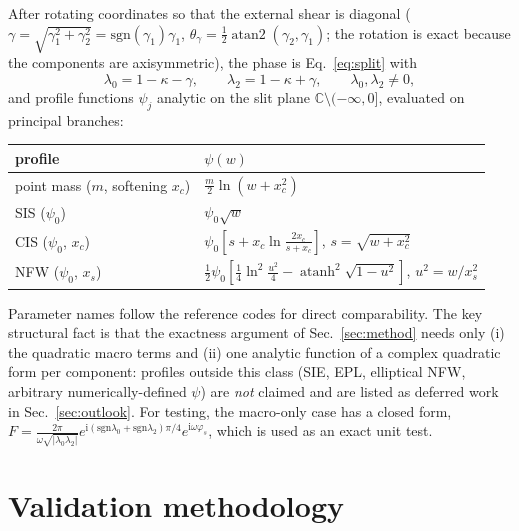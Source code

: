 \documentclass[11pt,a4paper]{article}
\newcommand{\Fresnel}{F}
\newcommand{\ii}{\mathrm{i}}
\newcommand{\C}{\mathbb{C}}
\begin{document}
After rotating coordinates so that the external shear is diagonal
($\gamma = \sqrt{\gamma_1^2+\gamma_2^2} = \mathrm{sgn}(\gamma_1)\gamma_1$,
$\theta_\gamma = \tfrac12\operatorname{atan2}(\gamma_2,\gamma_1)$; the
rotation is exact because the components are axisymmetric), the phase is
Eq.~\eqref{eq:split} with
\begin{equation}
  \lambda_0 = 1-\kappa-\gamma,\qquad \lambda_2 = 1-\kappa+\gamma,
  \qquad \lambda_0,\lambda_2 \neq 0 ,
  \label{eq:lambdas}
\end{equation}
and profile functions $\psi_j$ analytic on the slit plane $\C\setminus
(-\infty,0]$, evaluated on principal branches:
\begin{center}
\small
\setlength{\tabcolsep}{4pt}
\begin{tabular}{@{}>{\raggedright\arraybackslash}p{3.6cm}>{\raggedright\arraybackslash}p{11.2cm}@{}}
\toprule
profile & $\psi(w)$\\
\midrule
point mass ($m$, softening $x_c$) & $\tfrac{m}{2}\ln\!\left(w+x_c^2\right)$\\
SIS ($\psi_0$) & $\psi_0\sqrt{w}$\\
CIS ($\psi_0$, $x_c$) & $\psi_0\left[s + x_c \ln\frac{2x_c}{s+x_c}\right]$,
  \quad $s = \sqrt{w+x_c^2}$\\
NFW ($\psi_0$, $x_s$) & $\tfrac12\psi_0\left[\tfrac14\ln^2\frac{u^2}{4} -
  \operatorname{atanh}^2\!\sqrt{1-u^2}\right]$, \quad $u^2 = w/x_s^2$\\
\bottomrule
\end{tabular}
\end{center}
Parameter names follow the reference codes for direct comparability.  The
key structural fact is that the exactness argument of Sec.~\ref{sec:method}
needs only (i) the quadratic macro terms and (ii) one analytic function of a
complex quadratic form per component: profiles outside this class (SIE,
EPL, elliptical NFW, arbitrary numerically-defined $\psi$) are \emph{not}
claimed and are listed as deferred work in Sec.~\ref{sec:outlook}.  For
testing, the macro-only case has a closed form,
$\Fresnel = \frac{2\pi}{\omega\sqrt{|\lambda_0\lambda_2|}}
e^{\ii(\mathrm{sgn}\lambda_0+\mathrm{sgn}\lambda_2)\pi/4}
e^{\ii\omega\varphi_s}$, which is used as an exact unit test.

\section{Validation methodology}
\label{sec:val}
\end{document}
